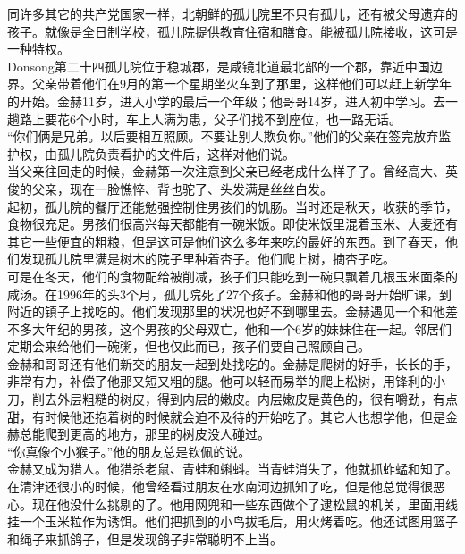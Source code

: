 同许多其它的共产党国家一样，北朝鲜的孤儿院里不只有孤儿，还有被父母遗弃的孩子。就像是全日制学校，孤儿院提供教育住宿和膳食。能被孤儿院接收，这可是一种特权。\\

Donsong第二十四孤儿院位于稳城郡，是咸镜北道最北部的一个郡，靠近中国边界。父亲带着他们在9月的第一个星期坐火车到了那里，这样他们可以赶上新学年的开始。金赫11岁，进入小学的最后一个年级；他哥哥14岁，进入初中学习。去一趟路上要花6个小时，车上人满为患，父子们找不到座位，也一路无话。\\

“你们俩是兄弟。以后要相互照顾。不要让别人欺负你。”他们的父亲在签完放弃监护权，由孤儿院负责看护的文件后，这样对他们说。\\

当父亲往回走的时候，金赫第一次注意到父亲已经老成什么样子了。曾经高大、英俊的父亲，现在一脸憔悴、背也驼了、头发满是丝丝白发。\\

起初，孤儿院的餐厅还能勉强控制住男孩们的饥肠。当时还是秋天，收获的季节，食物很充足。男孩们很高兴每天都能有一碗米饭。即使米饭里混着玉米、大麦还有其它一些便宜的粗粮，但是这可是他们这么多年来吃的最好的东西。到了春天，他们发现孤儿院里满是树木的院子里种着杏子。他们爬上树，摘杏子吃。\\

可是在冬天，他们的食物配给被削减，孩子们只能吃到一碗只飘着几根玉米面条的咸汤。在1996年的头3个月，孤儿院死了27个孩子。金赫和他的哥哥开始旷课，到附近的镇子上找吃的。他们发现那里的状况也好不到哪里去。金赫遇见一个和他差不多大年纪的男孩，这个男孩的父母双亡，他和一个6岁的妹妹住在一起。邻居们定期会来给他们一碗粥，但也仅此而已，孩子们要自己照顾自己。\\

金赫和哥哥还有他们新交的朋友一起到处找吃的。金赫是爬树的好手，长长的手，非常有力，补偿了他那又短又粗的腿。他可以轻而易举的爬上松树，用锋利的小刀，削去外层粗糙的树皮，得到内层的嫩皮。内层嫩皮是黄色的，很有嚼劲，有点甜，有时候他还抱着树的时候就会迫不及待的开始吃了。其它人也想学他，但是金赫总能爬到更高的地方，那里的树皮没人碰过。\\

“你真像个小猴子。”他的朋友总是钦佩的说。\\

金赫又成为猎人。他猎杀老鼠、青蛙和蝌蚪。当青蛙消失了，他就抓蚱蜢和知了。在清津还很小的时候，他曾经看过朋友在水南河边抓知了吃，但是他总觉得很恶心。现在他没什么挑剔的了。他用网兜和一些东西做个了逮松鼠的机关，里面用线挂一个玉米粒作为诱饵。他们把抓到的小鸟拔毛后，用火烤着吃。他还试图用篮子和绳子来抓鸽子，但是发现鸽子非常聪明不上当。\\

